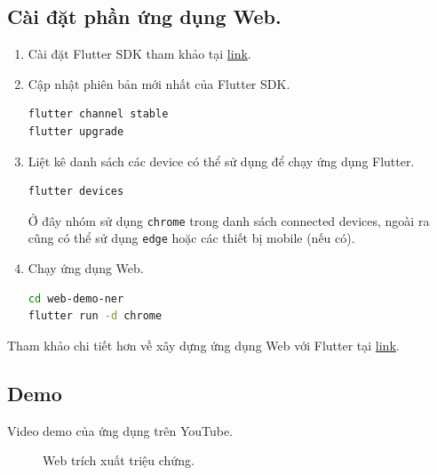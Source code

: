 \subsection{Cài đặt phần ứng dụng Web.}
\begin{enumerate}
\item Cài đặt Flutter SDK tham khảo tại \href{https://docs.flutter.dev/get-started/install}{link}.
\item Cập nhật phiên bản mới nhất của Flutter SDK.
\lstset{style=mystyle}
\begin{lstlisting}[language=bash]
flutter channel stable
flutter upgrade
\end{lstlisting}
\item Liệt kê danh sách các device có thể sử dụng để chạy ứng dụng Flutter.
\begin{lstlisting}[language=bash]
flutter devices
\end{lstlisting}
 Ở đây nhóm sử dụng \texttt{chrome} trong danh sách connected devices, ngoài ra cũng có thể sử dụng \texttt{edge} hoặc các thiết bị mobile (nếu có).

\item Chạy ứng dụng Web.
\begin{lstlisting}[language=bash]
cd web-demo-ner
flutter run -d chrome
\end{lstlisting}
\end{enumerate}
Tham khảo chi tiết hơn về xây dựng ứng dụng Web với Flutter tại \href{https://docs.flutter.dev/get-started/web}{link}.

\subsection{Demo}
Video demo của ứng dụng trên YouTube.

\begin{figure}
\centering
{}
\caption{Web trích xuất triệu chứng.}
\label{fig:web-demo}
\end{figure}